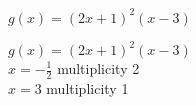 {$g(x) = (2x+1)^2(x-3)$
}
{ $g(x) = (2x+1)^2(x-3)$\\
$x=-\frac{1}{2}$ multiplicity 2 \\
$x=3$ multiplicity 1

\begin{center}
\end{center}}